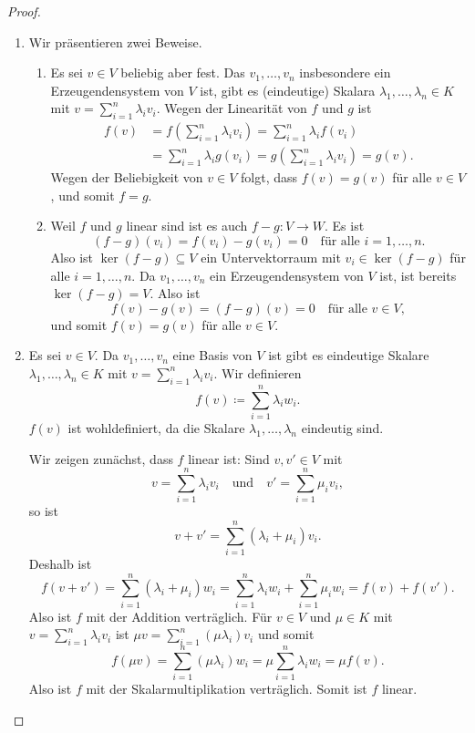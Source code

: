 \documentclass[a4paper,10pt]{article}
\begin{document}
\begin{proof}
\begin{enumerate}[label=\roman*)]
  \item\label{enum: Eindeutigkeit lineare Abbildung}
   Wir präsentieren zwei Beweise.
   \begin{enumerate}[label=\arabic*.]
   
    \item
     Es sei $v \in V$ beliebig aber fest. Das $v_1, \dotsc, v_n$ insbesondere ein Erzeugendensystem von $V$ ist, gibt es (eindeutige) Skalara $\lambda_1, \dotsc, \lambda_n \in K$ mit $v = \sum_{i=1}^n \lambda_i v_i$. Wegen der Linearität von $f$ und $g$ ist
     \begin{align*}
      f(v)
      &= f\left( \sum_{i=1}^n \lambda_i v_i \right)
      = \sum_{i=1}^n \lambda_i f(v_i) \\
      &= \sum_{i=1}^n \lambda_i g(v_i)
      = g\left( \sum_{i=1}^n \lambda_i v_i \right)
      = g(v).
     \end{align*}
     Wegen der Beliebigkeit von $v \in V$ folgt, dass $f(v) = g(v)$ für alle $v \in V$, und somit $f = g$.
     
    \item
     Weil $f$ und $g$ linear sind ist es auch $f-g \colon V \to W$. Es ist
     \[
      (f-g)(v_i) = f(v_i) - g(v_i) = 0 \quad \text{für alle $i = 1, \dotsc, n$}.
     \]
     Also ist $\ker(f-g) \subseteq V$ ein Untervektorraum mit $v_i \in \ker(f-g)$ für alle $i = 1, \dotsc, n$. Da $v_1, \dotsc, v_n$ ein Erzeugendensystem von $V$ ist, ist bereits $\ker(f-g) = V$. Also ist
     \[
      f(v) - g(v) = (f-g)(v) = 0 \quad \text{für alle $v \in V$},
     \]
     und somit $f(v) = g(v)$ für alle $v \in V$.
   \end{enumerate}
   
  \item\label{enum: Existenz einer linearen Abbildung}
   Es sei $v \in V$. Da $v_1, \dotsc, v_n$ eine Basis von $V$ ist gibt es eindeutige Skalare $\lambda_1, \dotsc, \lambda_n \in K$ mit $v = \sum_{i=1}^n \lambda_i v_i$. Wir definieren
   \[
    f(v) \coloneqq \sum_{i=1}^n \lambda_i w_i.
   \]
   $f(v)$ ist wohldefiniert, da die Skalare $\lambda_1, \dotsc, \lambda_n$ eindeutig sind.
   
   Wir zeigen zunächst, dass $f$ linear ist: Sind $v, v' \in V$ mit
   \[
    v = \sum_{i=1}^n \lambda_i v_i \quad \text{und} \quad v' = \sum_{i=1}^n \mu_i v_i,
   \]
   so ist
   \[
    v + v' = \sum_{i=1}^n (\lambda_i + \mu_i) v_i.
   \]
   Deshalb ist
   \[
    f(v + v')
    = \sum_{i=1}^n (\lambda_i + \mu_i) w_i
    = \sum_{i=1}^n \lambda_i w_i + \sum_{i=1}^n \mu_i w_i
    = f(v) + f(v').
   \]
   Also ist $f$ mit der Addition verträglich. Für $v \in V$ und $\mu \in K$ mit $v = \sum_{i=1}^n \lambda_i v_i$ ist $\mu v = \sum_{i=1}^n (\mu \lambda_i) v_i$ und somit
   \[
    f(\mu v)
    = \sum_{i=1}^n (\mu \lambda_i) w_i
    = \mu \sum_{i=1}^n \lambda_i w_i
    = \mu f(v).
   \]
   Also ist $f$ mit der Skalarmultiplikation verträglich. Somit ist $f$ linear.
   

\end{enumerate}
\end{proof}
\end{document}
